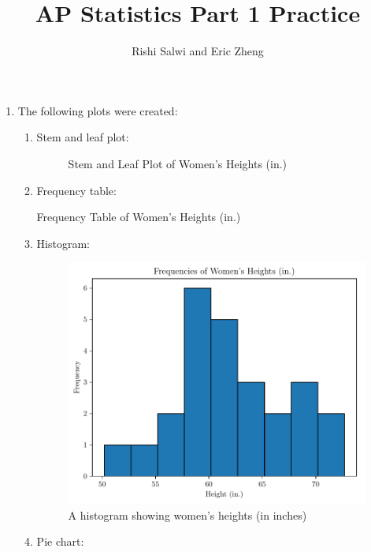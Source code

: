 \documentclass{article}
\title{AP Statistics Part 1 Practice}
\author{Rishi Salwi and Eric Zheng}
\begin{document}
\maketitle

\begin{enumerate}
  \item The following plots were created:
    \begin{enumerate}
      \item Stem and leaf plot:
        \begin{figure}[H]
          \centering
          \caption{Stem and Leaf Plot of Women's Heights (in.)}
          
        \end{figure}
      \item Frequency table:
        \begin{table}[H]
          \centering
          \caption{Frequency Table of Women's Heights (in.)}
          
        \end{table}
      \item Histogram:
        \begin{figure}[H]
          \centering
          \includegraphics[width=\textwidth]{plots/histogram.pdf}
          \caption{A histogram showing women's heights (in inches)}
        \end{figure}
      \item Pie chart:
        \begin{figure}[H]
          \centering

\end{figure}
\end{enumerate}
\end{enumerate}
\end{document}
